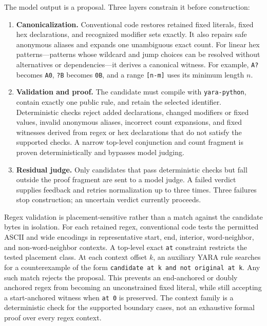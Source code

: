 \documentclass[11pt,twocolumn]{article}
\newcommand{\code}[1]{\texttt{#1}}
\begin{document}
The model output is a proposal. Three layers constrain it before construction:
\begin{enumerate}[leftmargin=1.6em]
  \item \textbf{Canonicalization.} Conventional code restores retained fixed
  literals, fixed hex declarations, and recognized modifier sets exactly. It
  also repairs safe anonymous aliases and expands one unambiguous exact count.
  For linear hex
  patterns---patterns whose wildcard and jump choices can be resolved without
  alternatives or dependencies---it derives a canonical witness. For example,
  \code{A?} becomes \code{A0}, \code{?B} becomes \code{0B}, and a range
  \code{[n-m]} uses its minimum length $n$.
  \item \textbf{Validation and proof.} The candidate must compile with
  \code{yara-python}, contain exactly one public rule, and retain the selected
  identifier. Deterministic checks reject added declarations, changed modifiers
  or fixed values, invalid anonymous aliases, incorrect count expansions, and
  fixed witnesses derived from regex or hex declarations that do not satisfy the
  supported checks. A
  narrow top-level conjunction and count fragment is proven deterministically
  and bypasses model judging.
  \item \textbf{Residual judge.} Only candidates that pass deterministic checks
  but fall outside the proof fragment are sent to a model judge. A failed verdict
  supplies feedback and retries normalization up to three times. Three
  failures stop construction; an uncertain verdict currently proceeds.
\end{enumerate}

Regex validation is placement-sensitive rather than a match against the
candidate bytes in isolation. For each retained regex, conventional code tests
the permitted ASCII and wide encodings in representative start, end, interior,
word-neighbor, and non-word-neighbor contexts. A top-level exact \code{at}
constraint restricts the tested placement class. At each context offset $k$, an
auxiliary YARA rule searches for a counterexample of the form
\code{candidate at k and not original at k}. Any such match rejects the proposal.
This prevents an end-anchored or doubly anchored regex from becoming an
unconstrained fixed literal, while still accepting a start-anchored witness when
\code{at 0} is preserved. The context family is a deterministic check for the
supported boundary cases, not an exhaustive formal proof over every regex
context.
\end{document}
